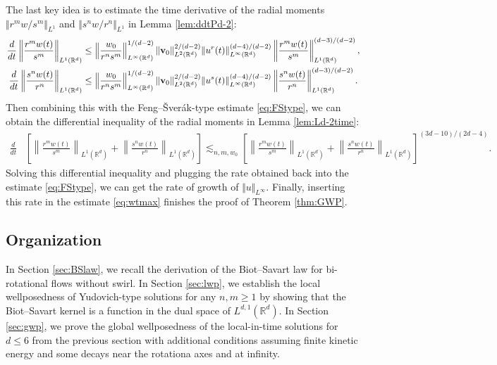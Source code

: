 \documentclass[11pt]{amsart}
\theoremstyle{definition}
\theoremstyle{remark}
\numberwithin{equation}{section}
\numberwithin{equation}{section}
\newcommand{\nrm}[1]{\Vert#1\Vert}
\newcommand{\0}{\emptyset}
\newcommand{\ift}{\infty}
\newcommand{\bfv}{{\bf v}}
\newcommand{\bbR}{\mathbb R}
\begin{document}
	The last key idea is to estimate the time derivative of the radial moments $\nrm{r^{m}w/s^{m}}_{L^{1}}$ and $\nrm{s^{n}w/r^{n}}_{L^{1}}$ in Lemma \ref{lem:ddtPd-2}:
	\begin{align}
		\frac{d}{dt}\left\| \frac{r^{m}w(t)}{s^{m}}\right\|_{L^{1}(\bbR^{d})}&\leq \left\| \frac{w_{0}}{r^{n}s^{m}}\right\|_{L^{\ift}(\bbR^{d})}^{1/(d-2)}\nrm{\bfv_{0}}_{L^{2}(\bbR^{d})}^{2/(d-2)}\nrm{u^{r}(t)}_{L^{\ift}(\bbR^{d})}^{(d-4)/(d-2)}%
		\left\| \frac{r^{m}w(t)}{s^{m}}\right\|_{L^{1}(\bbR^{d})}^{(d-3)/(d-2)},\\
		\frac{d}{dt}\left\| \frac{s^{n}w(t)}{r^{n}}\right\|_{L^{1}(\bbR^{d})}&\leq \left\| \frac{w_{0}}{r^{n}s^{m}}\right\|_{L^{\ift}(\bbR^{d})}^{1/(d-2)}\nrm{\bfv_{0}}_{L^{2}(\bbR^{d})}^{2/(d-2)}\nrm{u^{s}(t)}_{L^{\ift}(\bbR^{d})}^{(d-4)/(d-2)}%
		\left\| \frac{s^{n}w(t)}{r^{n}}\right\|_{L^{1}(\bbR^{d})}^{(d-3)/(d-2)}.
	\end{align}
	Then combining this with the Feng--\v{S}ver\'{a}k-type estimate \eqref{eq:FStype}, we can obtain the differential inequality of the radial moments in Lemma \ref{lem:Ld-2time}:
	\begin{equation}
		\begin{aligned}
			\frac{d}{dt}&\left[\left\| \frac{r^{m}w(t)}{s^{m}}\right\|_{L^{1}(\bbR^{d})}+ \left\| \frac{s^{n}w(t)}{r^{n}}\right\|_{L^{1}(\bbR^{d})}\right]\lesssim_{n,m,w_{0}}%
			\left[\left\| \frac{r^{m}w(t)}{s^{m}}\right\|_{L^{1}(\bbR^{d})}+ \left\| \frac{s^{n}w(t)}{r^{n}}\right\|_{L^{1}(\bbR^{d})}\right]^{(3d-10)/(2d-4)}.
		\end{aligned}
	\end{equation}
	Solving this differential inequality and plugging the rate obtained back into the estimate \eqref{eq:FStype}, we can get the rate of growth of $\nrm{u}_{L^{\ift}}$. Finally, inserting this rate in the estimate \eqref{eq:wtmax} finishes the proof of Theorem \ref{thm:GWP}.
	
	\subsection{Organization}
	In Section \ref{sec:BSlaw}, we recall the derivation of the Biot--Savart law for bi-rotational flows without swirl. In Section \ref{sec:lwp}, we establish the local wellposedness of Yudovich-type solutions for any $n,m\geq1$ by showing that the Biot--Savart kernel is a function in the dual space of $L^{d,1}(\bbR^{d})$. In Section \ref{sec:gwp}, we prove the global wellposedness of the local-in-time solutions for $d\leq6$ from the previous section with additional conditions assuming finite kinetic energy and some decays near the rotationa axes and at infinity. %
	
\end{document}
